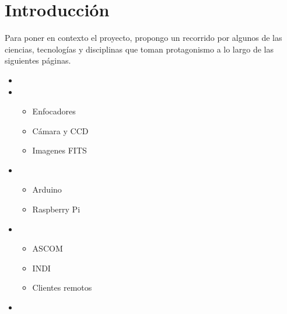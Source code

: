 \chapter{Introducción}

Para poner en contexto el proyecto,  propongo un recorrido por algunos de las ciencias, tecnologías y disciplinas que toman protagonismo a lo largo de las siguientes páginas.


\begin{itemize}
  \item {}
  \item {}
  \begin{itemize}
    \item{Enfocadores}
    \item{Cámara y CCD}
    \item{Imagenes FITS}
  \end{itemize}
  \item {}
   \begin{itemize}
     \item{Arduino}
     \item{Raspberry Pi}
   \end{itemize}
  \item {}
   \begin{itemize}
     \item{ASCOM}
     \item{INDI}
     \item{Clientes remotos}
  \end{itemize}
  \item {}

\end{itemize}
